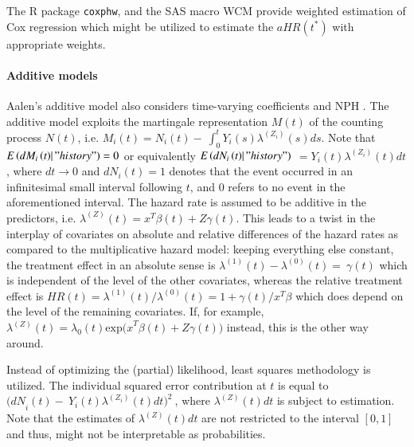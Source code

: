 \noindent 


\noindent The R package \texttt{coxphw}, and the SAS macro WCM provide weighted estimation of Cox regression which might be utilized to estimate the $aHR(t^*)$ with appropriate weights. 

\noindent 


\paragraph{Additive models} \label{additive}

\noindent 


\noindent Aalen's additive model also considers time-varying coefficients and NPH \cite{Aalen.2008}. The additive model exploits the martingale representation $M(t)$ of the counting process $N(t)$, i.e. $M_i\left(t\right)=N_i\left(t\right)-\ \int^t_0{Y_i\left(s\right){\lambda }^{\left(Z_i\right)}(s)ds}$. Note that $E\left(dM_i\left(t\right)\right|"history")=0$ or equivalently  ${E\left(dN_i\left(t\right)\right|"history")}$ $={Y}_i\left(t\right){\lambda }^{\left(Z_i\right)}(t)dt$, where $dt\to 0$ and $dN_i\left(t\right)=1$ denotes that the event occurred in an infinitesimal small interval following $t$, and $0$ refers to no event in the aforementioned interval. The hazard rate is assumed to be additive in the predictors, i.e. ${\lambda }^{\left(Z\right)}\left(t\right)=x^T\beta (t)+Z\gamma (t)$. This leads to a twist in the interplay of covariates on absolute and relative differences of the hazard rates as compared to the multiplicative hazard model: keeping everything else constant, the treatment effect in an absolute sense is ${\lambda }^{\left(1\right)}\left(t\right)-{\lambda }^{\left(0\right)}\left(t\right)=\ \gamma (t)$ which is independent of the level of the other covariates, whereas the relative treatment effect is $HR\left(t\right)={{\lambda }^{\left(1\right)}(t)}/{{\lambda }^{\left(0\right)}(t)}={1+\gamma \left(t\right)}/{x^T\beta }$ which does depend on the level of the remaining covariates. If, for example, ${\lambda }^{\left(Z\right)}\left(t\right)={\lambda }_0(t){\mathrm{exp}\mathrm{}(x}^T\beta (t)+Z\gamma (t))$ instead, this is the other way around.

\noindent 

\noindent Instead of optimizing the (partial) likelihood, least squares methodology is utilized. The individual squared error contribution at $t$ is equal to ${(dN}_i\left(t\right)-\ Y_i\left(t\right){\lambda }^{\left(Z_i\right)}(t){dt)}^2\ $, where ${\lambda }^{\left(Z\right)}(t)dt$ is subject to estimation. Note that the estimates of ${\lambda }^{\left(Z\right)}(t)dt$ are not restricted to the interval $[0,1]$ and thus, might not be interpretable as probabilities. 

